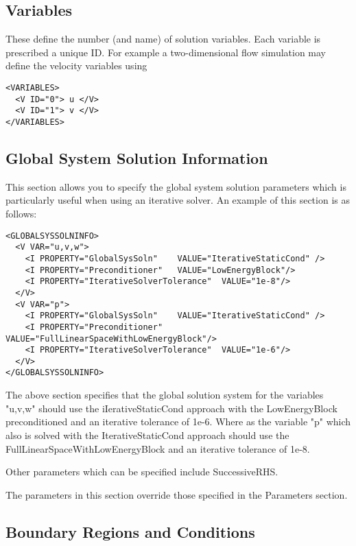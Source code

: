 \subsection{Variables}

These define the number (and name) of solution variables. Each variable is
prescribed a unique ID. For example a two-dimensional flow simulation may define
the velocity variables using

\begin{lstlisting}[style=XMLStyle]
<VARIABLES>
  <V ID="0"> u </V>
  <V ID="1"> v </V>
</VARIABLES>
\end{lstlisting}

\subsection{Global System Solution Information}

This section allows you to specify the global system solution parameters which
is particularly useful when using an iterative solver. An example of this
section is as follows:

\begin{lstlisting}[style=XMLStyle]
<GLOBALSYSSOLNINFO>
  <V VAR="u,v,w">
    <I PROPERTY="GlobalSysSoln"    VALUE="IterativeStaticCond" />
    <I PROPERTY="Preconditioner"   VALUE="LowEnergyBlock"/>
    <I PROPERTY="IterativeSolverTolerance"  VALUE="1e-8"/>
  </V>
  <V VAR="p">
    <I PROPERTY="GlobalSysSoln"    VALUE="IterativeStaticCond" />
    <I PROPERTY="Preconditioner"   VALUE="FullLinearSpaceWithLowEnergyBlock"/>
    <I PROPERTY="IterativeSolverTolerance"  VALUE="1e-6"/>
  </V>
</GLOBALSYSSOLNINFO>
\end{lstlisting}

The above section specifies that the global solution system for the variables
"u,v,w" should use the iIerativeStaticCond approach with the LowEnergyBlock
preconditioned and an iterative tolerance of 1e-6.  Where as the variable "p"
which also is solved with the IterativeStaticCond approach should use the
FullLinearSpaceWithLowEnergyBlock and an iterative tolerance of 1e-8.

Other parameters which can be specified include SuccessiveRHS. 

The parameters in this section override those specified in the Parameters section. 

\subsection{Boundary Regions and Conditions}

